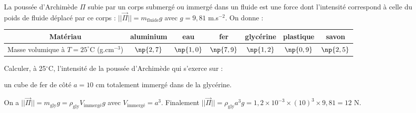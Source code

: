 \hauteurLargeurCadreReponse		{8mm}{1.5cm}
\initialisationEntrainement

La poussée d'Archimède $\Pi$ subie par un corps submergé ou immergé dans un fluide est une force dont l'intensité correspond à celle du poids de fluide déplacé par ce corps : $|| \overrightarrow{\Pi}||=m_\mathrm{fluide} g$ avec $g=9,81$ m.s$^{-2}$. On donne :

\begin{center}
\begin{tabular}{ |c|c|c|c|c|c|c| } 
 \hline
 Matériau & aluminium & eau&  fer & glycérine & plastique & savon \\
 \hline 
 Masse volumique à $T=25^\circ$C (g.cm$^{-3}$) & $\np{2,7}$ & $\np{1,0}$ & $\np{7,9}$ & $\np{1,2}$ & $\np{0,9}$ & $\np{2,5}$\\
 \hline
\end{tabular}
\end{center}



Calculer, à 25$^\circ$C, l'intensité de la poussée d'Archimède qui s'exerce sur :

\debutEntrainement


\begin{enonce}
un cube de fer de côté $a=10$ cm totalement immergé dans de la glycérine.
\end{enonce}


\begin{corrige}
On a $|| \overrightarrow{\Pi}||=m_\mathrm{gly} g = \rho_\mathrm{gly} V_\mathrm{immergé} g$ avec $V_\mathrm{immergé}= a^3$. Finalement $|| \overrightarrow{\Pi}||=\rho_\mathrm{gly} a^3 g=1,2\times 10^{-3} \times (10)^3 \times 9,81=12$ N.
\end{corrige}


